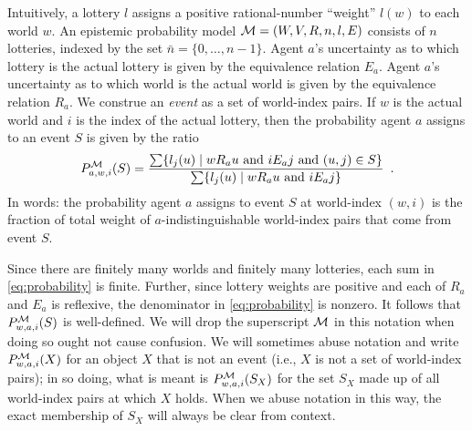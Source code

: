\documentclass[12pt]{article}
\theoremstyle{definition}
\newcommand{\M}{{\cal M}}      %
\begin{document}
Intuitively, a lottery $l$ assigns a positive rational-number
``weight'' $l(w)$ to each world $w$.  An epistemic probability model
$\M=(W,V,R,n,l,E)$ consists of $n$ lotteries, indexed by the set
$\bar{n}=\{0,\dots,n-1\}$.  Agent $a$'s uncertainty as to which
lottery is the actual lottery is given by the equivalence relation
$E_a$.  Agent $a$'s uncertainty as to which world is the actual world
is given by the equivalence relation $R_a$.  We construe an
\emph{event} as a set of world-index pairs.  If $w$ is the actual
world and $i$ is the index of the actual lottery, then the probability
agent $a$ assigns to an event $S$ is given by the ratio
\begin{equation}
  P^{\M}_{a,w,i}(S) = \frac{\sum \{l_j(u) \mid wR_au \text{ and } iE_aj
    \text{ and } (u,j)\in S \}} {\sum \{l_j(u) \mid wR_au \text{ and }
    iE_aj\}}\enspace.
  \label{eq:probability}
\end{equation}
In words: the probability agent $a$ assigns to event $S$ at
world-index $(w,i)$ is the fraction of total weight of
$a$-indistinguishable world-index pairs that come from event $S$.

Since there are finitely many worlds and finitely many lotteries, each
sum in \eqref{eq:probability} is finite.  Further, since lottery
weights are positive and each of $R_a$ and $E_a$ is reflexive, the
denominator in \eqref{eq:probability} is nonzero.  It follows that
$P^{\M}_{w,a,i}(S)$ is well-defined.  We will drop the superscript
$\M$ in this notation when doing so ought not cause confusion.  We
will sometimes abuse notation and write $P^{\M}_{w,a,i}(X)$ for an
object $X$ that is not an event (i.e., $X$ is not a set of world-index
pairs); in so doing, what is meant is $P^{\M}_{w,a,i}(S_X)$ for the
set $S_X$ made up of all world-index pairs at which $X$ holds.  When
we abuse notation in this way, the exact membership of $S_X$ will
always be clear from context.
\end{document}
